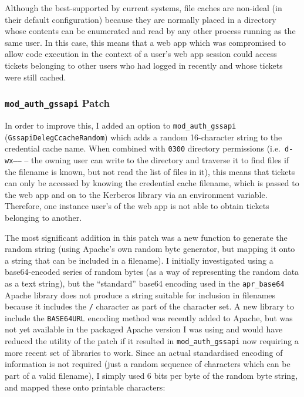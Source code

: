 \documentclass{article}
\begin{document}
Although the best-supported by current systems, file caches are non-ideal (in their default configuration) because they are normally placed in a directory whose contents can be enumerated and read by any other process running as the same user. In this case, this means that a web app which was compromised to allow code execution in the context of a user's web app session could access tickets belonging to other users who had logged in recently and whose tickets were still cached.

\subsubsection{\texttt{mod\_auth\_gssapi} Patch}
In order to improve this, I added an option to \verb+mod_auth_gssapi+ (\texttt{GssapiDelegCcacheRandom}) which adds a random 16-character string to the credential cache name. When combined with \texttt{0300} directory permissions (i.e.\ \texttt{d-wx------} -- the owning user can write to the directory and traverse it to find files if the filename is known, but not read the list of files in it), this means that tickets can only be accessed by knowing the credential cache filename, which is passed to the web app and on to the Kerberos library via an environment variable. Therefore, one instance user's of the web app is not able to obtain tickets belonging to another.

The most significant addition in this patch was a new function to generate the random string (using Apache's own random byte generator, but mapping it onto a string that can be included in a filename). I initially investigated using a base64-encoded series of random bytes (as a way of representing the random data as a text string), but the ``standard'' base64 encoding used in the \verb+apr_base64+ Apache library does not produce a string suitable for inclusion in filenames because it includes the \verb+/+ character as part of the character set\cite{RFC4648}. A new library to include the \texttt{BASE64URL} encoding method was recently added to Apache\cite{Apache-base64-commit}, but was not yet available in the packaged Apache version I was using and would have reduced the utility of the patch if it resulted in \verb+mod_auth_gssapi+ now requiring a more recent set of libraries to work. Since an actual standardised encoding of information is not required (just a random sequence of characters which can be part of a valid filename), I simply used 6 bits per byte of the random byte string, and mapped these onto printable characters:
\end{document}
